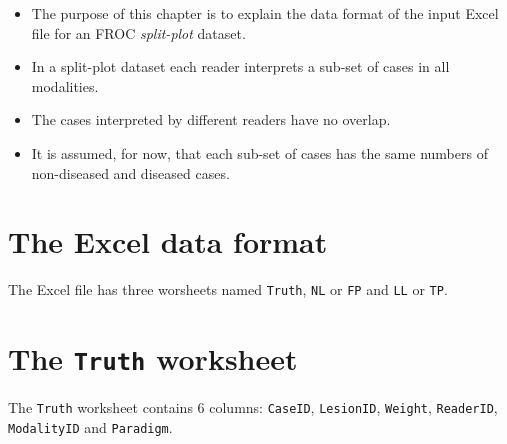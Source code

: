 \documentclass[
]{book}
\providecommand{\tightlist}{%
  \setlength{\itemsep}{0pt}\setlength{\parskip}{0pt}}
\begin{document}
\begin{itemize}
\tightlist
\item
  The purpose of this chapter is to explain the data format of the input Excel file for an FROC \emph{split-plot} dataset.
\item
  In a split-plot dataset each reader interprets a sub-set of cases in all modalities.
\item
  The cases interpreted by different readers have no overlap.
\item
  It is assumed, for now, that each sub-set of cases has the same numbers of non-diseased and diseased cases.
\end{itemize}

\hypertarget{the-excel-data-format-3}{%
\section{The Excel data format}\label{the-excel-data-format-3}}

The Excel file has three worsheets named \texttt{Truth}, \texttt{NL} or \texttt{FP} and \texttt{LL} or \texttt{TP}.

\hypertarget{the-truth-worksheet-3}{%
\section{\texorpdfstring{The \texttt{Truth} worksheet}{The Truth worksheet}}\label{the-truth-worksheet-3}}

The \texttt{Truth} worksheet contains 6 columns: \texttt{CaseID}, \texttt{LesionID}, \texttt{Weight}, \texttt{ReaderID}, \texttt{ModalityID} and \texttt{Paradigm}.
\end{document}
